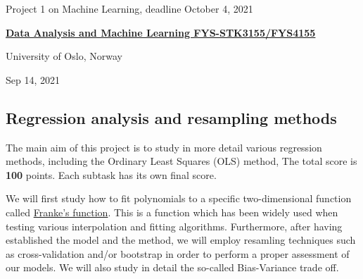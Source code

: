 \documentclass[%
oneside,                 %
final,                   %
10pt]{article}
\begin{document}

\newcommand{\exercisesection}[1]{\subsection*{#1}}






\thispagestyle{empty}

\begin{center}
{\LARGE\bf
\begin{spacing}{1.25}
Project 1 on Machine Learning, deadline October 4, 2021
\end{spacing}
}
\end{center}


\begin{center}
{\bf \href{{http://www.uio.no/studier/emner/matnat/fys/FYS3155/index-eng.html}}{Data Analysis and Machine Learning FYS-STK3155/FYS4155}}
\end{center}

    \begin{center}
\centerline{{\small University of Oslo, Norway}}
\end{center}
    

\begin{center}
Sep 14, 2021
\end{center}

\vspace{1cm}


\subsection{Regression analysis and resampling methods}

The main aim of this project is to study in more detail various
regression methods, including the Ordinary Least Squares (OLS) method,
The total score is \textbf{100} points. Each subtask has its own final score.


We will first study how to fit polynomials to a specific
two-dimensional function called \href{{http://www.dtic.mil/dtic/tr/fulltext/u2/a081688.pdf}}{Franke's
function}.  This
is a function which has been widely used when testing various
interpolation and fitting algorithms. Furthermore, after having
established the model and the method, we will employ resamling
techniques such as cross-validation and/or bootstrap in order to perform a
proper assessment of our models. We will also study in detail the
so-called Bias-Variance trade off.
\end{document}
